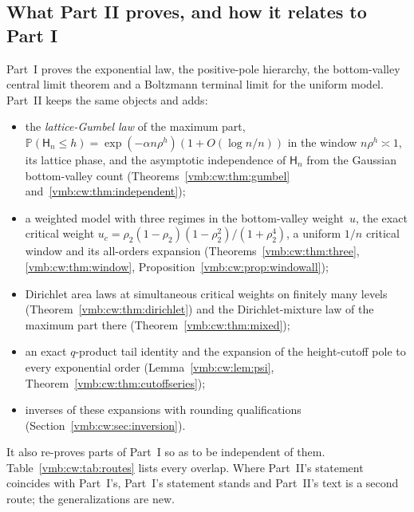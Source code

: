 \documentclass[11pt,a4paper]{article}
\numberwithin{equation}{section}
\theoremstyle{definition}\newtheorem{definition}[theorem]{Definition}
\theoremstyle{remark}\newtheorem{remark}[theorem]{Remark}
\newcommand{\Prob}{\mathbb P}
\begin{document}
\subsection{What Part II proves, and how it relates to Part I}
\label{vmb:cw:sec:claims}
Part~I proves the exponential law, the positive-pole hierarchy, the
bottom-valley central limit theorem and a Boltzmann terminal limit for the
uniform model. Part~II keeps the same objects and adds:
\begin{itemize}[leftmargin=*,itemsep=1pt]
\item the \emph{lattice-Gumbel law} of the maximum part,
 $\Prob(\mathsf H_n\le h)=\exp(-\alpha n\rho^h)(1+O(\log n/n))$ in the
 window $n\rho^h\asymp1$, its lattice phase, and the asymptotic independence
 of $\mathsf H_n$ from the Gaussian bottom-valley count
 (Theorems~\ref{vmb:cw:thm:gumbel} and~\ref{vmb:cw:thm:independent});
\item a weighted model with three regimes in the bottom-valley weight~$u$,
 the exact critical weight
 $u_c=\rho_2(1-\rho_2)(1-\rho_2^2)/(1+\rho_2^4)$, a uniform $1/n$ critical
 window and its all-orders expansion
 (Theorems~\ref{vmb:cw:thm:three}, \ref{vmb:cw:thm:window},
 Proposition~\ref{vmb:cw:prop:windowall});
\item Dirichlet area laws at simultaneous critical weights on finitely many
 levels (Theorem~\ref{vmb:cw:thm:dirichlet}) and the Dirichlet-mixture law of
 the maximum part there (Theorem~\ref{vmb:cw:thm:mixed});
\item an exact $q$-product tail identity and the expansion of the
 height-cutoff pole to every exponential order
 (Lemma~\ref{vmb:cw:lem:psi}, Theorem~\ref{vmb:cw:thm:cutoffseries});
\item inverses of these expansions with rounding qualifications
 (Section~\ref{vmb:cw:sec:inversion}).
\end{itemize}
It also re-proves parts of Part~I so as to be independent of them.
Table~\ref{vmb:cw:tab:routes} lists every overlap. Where Part~II's statement
coincides with Part~I's, Part~I's statement stands and Part~II's text is a
second route; the generalizations are new.
\end{document}
